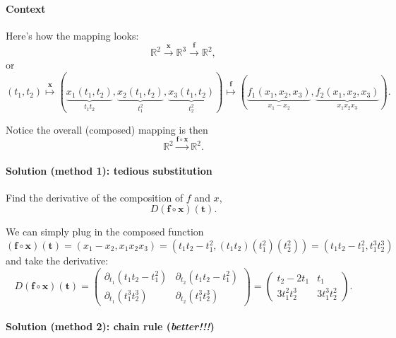 \documentclass[11pt]{article}
\renewcommand{\vec}[1]{\mathbf{#1}}
\begin{document}
\paragraph{Context}

Here's how the mapping looks:
\[
    \mathbb R^2 \overset{\vec x}{\to} \mathbb R^3 \overset{\vec f}{\to} \mathbb R^2,
\]
or
\[
    (t_1, t_2) 
    \overset{\vec x}{\mapsto} 
    (\underbrace{x_1(t_1, t_2)}_{t_1 t_2}, 
     \underbrace{x_2(t_1, t_2)}_{t_1^2}, 
     \underbrace{x_3(t_1, t_2)}_{t_2^2})
    \overset{\vec f}{\mapsto}
    (\underbrace{f_1(x_1, x_2, x_3)}_{x_1-x_2}, 
     \underbrace{f_2(x_1, x_2, x_3)}_{x_1 x_2 x_3}).
\]

Notice the overall (composed) mapping is then
\[
    \mathbb R^2 \xrightarrow{\vec f \circ \vec x} \mathbb R^2.
\]

\paragraph{Solution (method 1): tedious substitution}

Find the derivative of the composition of \(f\) and \(x\),
\[
    D(\vec f \circ \vec x)(\vec t).
\]

We can simply plug in the composed function 
\[
    (\vec f \circ \vec x)(\vec t) = (x_1-x_2, x_1 x_2 x_3) = (t_1 t_2 - t_1^2, (t_1 t_2) (t_1^2) (t_2^2)) = (t_1 t_2 - t_1^2, t_1^3 t_2^3)
\]
and take the derivative:
\[
    D(\vec f \circ \vec x)(\vec t) = 
    \begin{pmatrix}
        \partial_{t_1} \left(t_1 t_2 - t_1^2\right) & \partial_{t_2} \left(t_1 t_2 - t_1^2\right) \\
        \partial_{t_1} \left(t_1^3 t_2^3\right) & \partial_{t_2} \left(t_1^3 t_2^3\right)
    \end{pmatrix} =
    \begin{pmatrix}
        t_2 - 2 t_1 & t_1 \\
        3 t_1^2 t_2^3 & 3 t_1^3 t_2^2
    \end{pmatrix}.
\]

\paragraph{Solution (method 2): chain rule (\emph{better!!!})}
\end{document}
